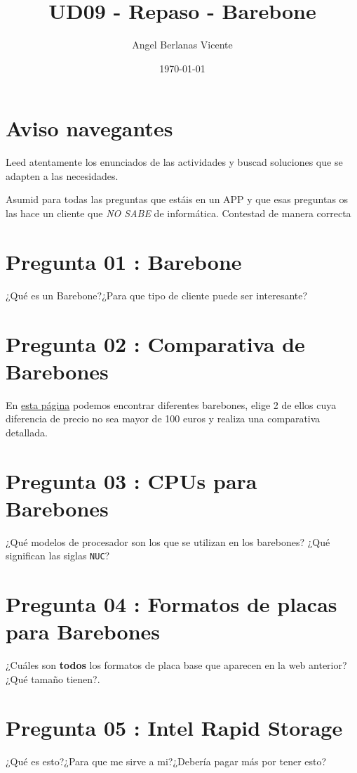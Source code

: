 \documentclass[11pt]{article}
\author{Angel Berlanas Vicente}
\date{\today}
\title{UD09 - Repaso - Barebone}
\begin{document}
\maketitle
\tableofcontents


\section{Aviso navegantes}
\label{sec:org9777c56}

Leed atentamente los enunciados de las actividades y buscad soluciones que se
adapten a las necesidades.

Asumid para todas las preguntas que estáis en un APP y que esas preguntas os
las hace un cliente que \emph{NO SABE} de informática. Contestad de manera correcta 

\section{Pregunta 01 : Barebone}
\label{sec:org2773604}

¿Qué es un Barebone?¿Para que tipo de cliente puede ser interesante?

\section{Pregunta 02 : Comparativa de Barebones}
\label{sec:org2e1c775}

En \href{https://www.pccomponentes.com/barebones}{esta página} podemos encontrar diferentes barebones, elige 2 de ellos cuya
diferencia de precio no sea mayor de 100 euros y realiza una comparativa
detallada.

\section{Pregunta 03 : CPUs para Barebones}
\label{sec:org3452253}

¿Qué modelos de procesador son los que se utilizan en los barebones? ¿Qué
significan las siglas \texttt{NUC}?

\section{Pregunta 04 : Formatos de placas para Barebones}
\label{sec:orgd440ef1}

¿Cuáles son \textbf{todos} los formatos de placa base que aparecen en la web
anterior? ¿Qué tamaño tienen?.

\section{Pregunta 05 : Intel Rapid Storage}
\label{sec:org02256ac}

¿Qué es esto?¿Para que me sirve a mi?¿Debería pagar más por tener esto?
\end{document}
